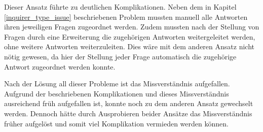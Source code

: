 Dieser Ansatz führte zu deutlichen Komplikationen. Neben dem in Kapitel \ref{inquirer_type_issue} beschriebenen Problem mussten manuell alle Antworten ihren jeweiligen Fragen zugeordnet werden. Zudem mussten nach der Stellung von Fragen durch eine Erweiterung die zugehörigen Antworten weitergeleitet werden, ohne weitere Antworten weiterzuleiten. Dies wäre mit dem anderen Ansatz nicht nötig gewesen, da hier der Stellung jeder Frage automatisch die zugehörige Antwort zugeordnet werden konnte.

Nach der Lösung all dieser Probleme ist das Missverständnis aufgefallen. Aufgrund der beschriebenen Komplikationen und dieses Missverständnis ausreichend früh aufgefallen ist, konnte noch zu dem anderen Ansatz gewechselt werden. Dennoch hätte durch Ausprobieren beider Ansätze das Missverständnis früher aufgelöst und somit viel Komplikation vermieden werden können.